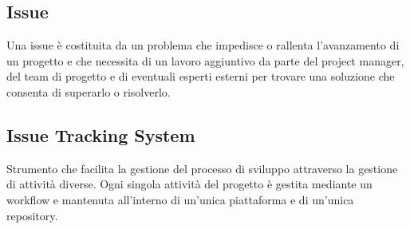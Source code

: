 \subsection*{Issue}
Una issue è costituita da un problema che impedisce o rallenta l’avanzamento di un progetto e che necessita di un lavoro aggiuntivo da parte del project manager, del team di progetto e di eventuali esperti esterni per trovare una soluzione che consenta di superarlo o risolverlo.

\subsection*{Issue Tracking System}
Strumento che facilita la gestione del processo di sviluppo attraverso la gestione di attività diverse.
Ogni singola attività del progetto è gestita mediante un workflow e mantenuta all’interno di un’unica piattaforma e di un’unica repository.

